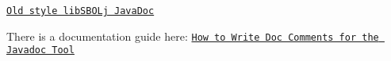 \begin{DoxyItemize}
\item \href{javadoc}{\tt Old style libSBOLj JavaDoc}
\item There is a documentation guide here: \href{http://www.oracle.com/technetwork/java/javase/documentation/index-137868.html}{\tt How to Write Doc Comments for the Javadoc Tool} 
\end{DoxyItemize}